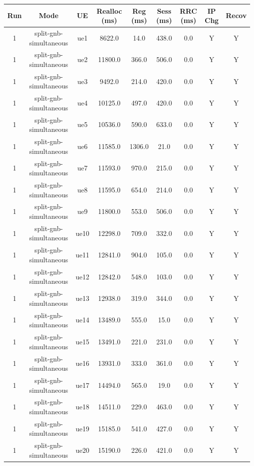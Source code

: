 \begin{table}[ht]
\centering
\begin{tabular}{|c|c|c|c|c|c|c|c|c|}
\hline
Run & Mode & UE & Realloc (ms) & Reg (ms) & Sess (ms) & RRC (ms) & IP Chg & Recov \\
\hline
1 & split-gnb-simultaneous & ue1 & 8622.0 & 14.0 & 438.0 & 0.0 & Y & Y \\
1 & split-gnb-simultaneous & ue2 & 11800.0 & 366.0 & 506.0 & 0.0 & Y & Y \\
1 & split-gnb-simultaneous & ue3 & 9492.0 & 214.0 & 420.0 & 0.0 & Y & Y \\
1 & split-gnb-simultaneous & ue4 & 10125.0 & 497.0 & 420.0 & 0.0 & Y & Y \\
1 & split-gnb-simultaneous & ue5 & 10536.0 & 590.0 & 633.0 & 0.0 & Y & Y \\
1 & split-gnb-simultaneous & ue6 & 11585.0 & 1306.0 & 21.0 & 0.0 & Y & Y \\
1 & split-gnb-simultaneous & ue7 & 11593.0 & 970.0 & 215.0 & 0.0 & Y & Y \\
1 & split-gnb-simultaneous & ue8 & 11595.0 & 654.0 & 214.0 & 0.0 & Y & Y \\
1 & split-gnb-simultaneous & ue9 & 11800.0 & 553.0 & 506.0 & 0.0 & Y & Y \\
1 & split-gnb-simultaneous & ue10 & 12298.0 & 709.0 & 332.0 & 0.0 & Y & Y \\
1 & split-gnb-simultaneous & ue11 & 12841.0 & 904.0 & 105.0 & 0.0 & Y & Y \\
1 & split-gnb-simultaneous & ue12 & 12842.0 & 548.0 & 103.0 & 0.0 & Y & Y \\
1 & split-gnb-simultaneous & ue13 & 12938.0 & 319.0 & 344.0 & 0.0 & Y & Y \\
1 & split-gnb-simultaneous & ue14 & 13489.0 & 555.0 & 15.0 & 0.0 & Y & Y \\
1 & split-gnb-simultaneous & ue15 & 13491.0 & 221.0 & 231.0 & 0.0 & Y & Y \\
1 & split-gnb-simultaneous & ue16 & 13931.0 & 333.0 & 361.0 & 0.0 & Y & Y \\
1 & split-gnb-simultaneous & ue17 & 14494.0 & 565.0 & 19.0 & 0.0 & Y & Y \\
1 & split-gnb-simultaneous & ue18 & 14511.0 & 229.0 & 463.0 & 0.0 & Y & Y \\
1 & split-gnb-simultaneous & ue19 & 15185.0 & 541.0 & 427.0 & 0.0 & Y & Y \\
1 & split-gnb-simultaneous & ue20 & 15190.0 & 226.0 & 421.0 & 0.0 & Y & Y \\

\end{tabular}
\end{table}
